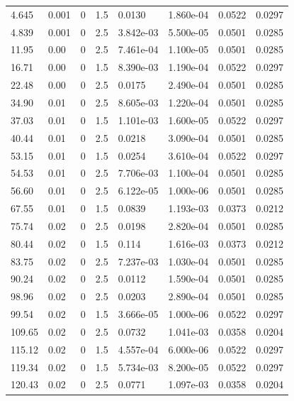 \documentclass[preview]{standalone}
\begin{document}
{{\begin{tabular}{L{1.2cm}C{1.2cm} C{0.3cm}C{0.5cm} C{1.4cm}C{1.4cm} C{1.4cm}C{1.4cm}}
  4.645  &  0.001  & 0     & 1.5 &  0.0130  & 1.860e-04  & 0.0522 &  0.0297   \\ 
  4.839  &  0.001  & 0     & 2.5 &  3.842e-03  & 5.500e-05  & 0.0501 &  0.0285   \\ 
  11.95  &  0.00  & 0     & 2.5 &  7.461e-04  & 1.100e-05  & 0.0501 &  0.0285   \\ 
  16.71  &  0.00  & 0     & 1.5 &  8.390e-03  & 1.190e-04  & 0.0522 &  0.0297   \\ 
  22.48  &  0.00  & 0     & 2.5 &  0.0175  & 2.490e-04  & 0.0501 &  0.0285   \\ 
  34.90  &  0.01  & 0     & 2.5 &  8.605e-03  & 1.220e-04  & 0.0501 &  0.0285   \\ 
  37.03  &  0.01  & 0     & 1.5 &  1.101e-03  & 1.600e-05  & 0.0522 &  0.0297   \\ 
  40.44  &  0.01  & 0     & 2.5 &  0.0218  & 3.090e-04  & 0.0501 &  0.0285   \\ 
  53.15  &  0.01  & 0     & 1.5 &  0.0254  & 3.610e-04  & 0.0522 &  0.0297   \\ 
  54.53  &  0.01  & 0     & 2.5 &  7.706e-03  & 1.100e-04  & 0.0501 &  0.0285   \\ 
  56.60  &  0.01  & 0     & 2.5 &  6.122e-05  & 1.000e-06  & 0.0501 &  0.0285   \\ 
  67.55  &  0.01  & 0     & 1.5 &  0.0839  & 1.193e-03  & 0.0373 &  0.0212   \\ 
  75.74  &  0.02  & 0     & 2.5 &  0.0198  & 2.820e-04  & 0.0501 &  0.0285   \\ 
  80.44  &  0.02  & 0     & 1.5 &  0.114  & 1.616e-03  & 0.0373 &  0.0212   \\ 
  83.75  &  0.02  & 0     & 2.5 &  7.237e-03  & 1.030e-04  & 0.0501 &  0.0285   \\ 
  90.24  &  0.02  & 0     & 2.5 &  0.0112  & 1.590e-04  & 0.0501 &  0.0285   \\ 
  98.96  &  0.02  & 0     & 2.5 &  0.0203  & 2.890e-04  & 0.0501 &  0.0285   \\ 
  99.54  &  0.02  & 0     & 1.5 &  3.666e-05  & 1.000e-06  & 0.0522 &  0.0297   \\ 
  109.65  &  0.02  & 0     & 2.5 &  0.0732  & 1.041e-03  & 0.0358 &  0.0204   \\ 
  115.12  &  0.02  & 0     & 1.5 &  4.557e-04  & 6.000e-06  & 0.0522 &  0.0297   \\ 
  119.34  &  0.02  & 0     & 1.5 &  5.734e-03  & 8.200e-05  & 0.0522 &  0.0297   \\ 
  120.43  &  0.02  & 0     & 2.5 &  0.0771  & 1.097e-03  & 0.0358 &  0.0204   \\ 

\end{tabular}}}
\end{document}
